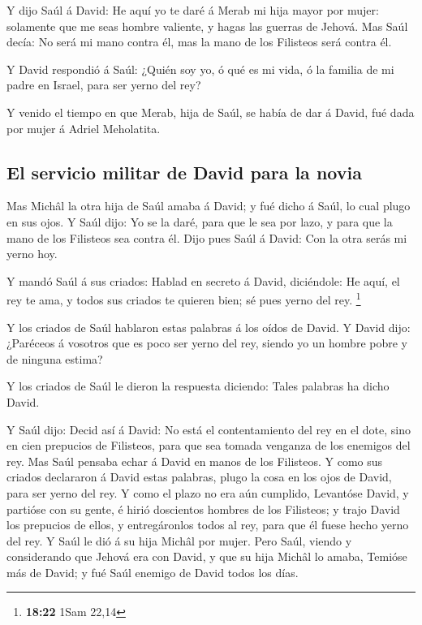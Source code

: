  Y dijo Saúl á David: He aquí yo te daré á Merab mi hija
mayor por mujer: solamente que me seas hombre valiente, y hagas las
guerras de Jehová. Mas Saúl decía: No será mi mano contra él, mas la
mano de los Filisteos será contra él.

 Y David respondió á Saúl: ¿Quién soy yo, ó qué es mi
vida, ó la familia de mi padre en Israel, para ser yerno del rey?

 Y venido el tiempo en que Merab, hija de Saúl, se había
de dar á David, fué dada por mujer á Adriel Meholatita.

\hypertarget{el-servicio-militar-de-david-para-la-novia}{%
\subsection{El servicio militar de David para la
novia}\label{el-servicio-militar-de-david-para-la-novia}}

 Mas Michâl la otra hija de Saúl amaba á David; y fué
dicho á Saúl, lo cual plugo en sus ojos.  Y Saúl dijo: Yo
se la daré, para que le sea por lazo, y para que la mano de los
Filisteos sea contra él. Dijo pues Saúl á David: Con la otra serás mi
yerno hoy.

 Y mandó Saúl á sus criados: Hablad en secreto á David,
diciéndole: He aquí, el rey te ama, y todos sus criados te quieren bien;
sé pues yerno del rey. \footnote{\textbf{18:22} 1Sam 22,14}

 Y los criados de Saúl hablaron estas palabras á los
oídos de David. Y David dijo: ¿Paréceos á vosotros que es poco ser yerno
del rey, siendo yo un hombre pobre y de ninguna estima?

 Y los criados de Saúl le dieron la respuesta diciendo:
Tales palabras ha dicho David.

 Y Saúl dijo: Decid así á David: No está el
contentamiento del rey en el dote, sino en cien prepucios de Filisteos,
para que sea tomada venganza de los enemigos del rey. Mas Saúl pensaba
echar á David en manos de los Filisteos.  Y como sus
criados declararon á David estas palabras, plugo la cosa en los ojos de
David, para ser yerno del rey. Y como el plazo no era aún cumplido,
 Levantóse David, y partióse con su gente, é hirió
doscientos hombres de los Filisteos; y trajo David los prepucios de
ellos, y entregáronlos todos al rey, para que él fuese hecho yerno del
rey. Y Saúl le dió á su hija Michâl por mujer.  Pero
Saúl, viendo y considerando que Jehová era con David, y que su hija
Michâl lo amaba,  Temióse más de David; y fué Saúl
enemigo de David todos los días.

